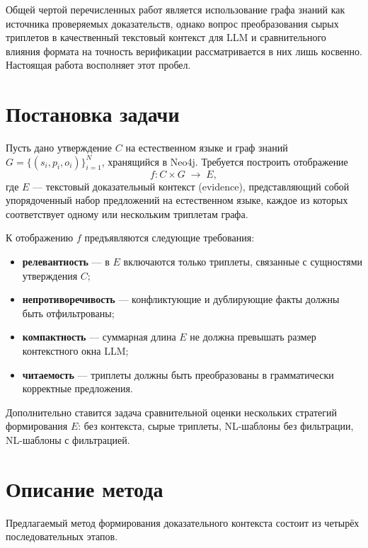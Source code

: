 \documentclass{misisarticle}
\begin{document}
Общей чертой перечисленных работ является использование
графа знаний как источника проверяемых доказательств,
однако вопрос преобразования сырых триплетов
в качественный текстовый контекст для LLM
и сравнительного влияния формата на точность верификации
рассматривается в них лишь косвенно.
Настоящая работа восполняет этот пробел.

\section{Постановка задачи}

Пусть дано утверждение $C$ на естественном языке
и граф знаний $G = \{(s_i, p_i, o_i)\}_{i=1}^{N}$,
хранящийся в Neo4j.
Требуется построить отображение
\begin{equation}
  f\colon C \times G \;\longrightarrow\; E,
  \label{eq:task}
\end{equation}
где $E$ — текстовый доказательный контекст (evidence),
представляющий собой упорядоченный набор предложений
на естественном языке, каждое из которых
соответствует одному или нескольким триплетам графа.

К отображению $f$ предъявляются следующие требования:
\begin{itemize}
  \item \textbf{релевантность} — в $E$ включаются только
    триплеты, связанные с сущностями утверждения $C$;
  \item \textbf{непротиворечивость} — конфликтующие
    и дублирующие факты должны быть отфильтрованы;
  \item \textbf{компактность} — суммарная длина $E$
    не должна превышать размер контекстного окна LLM;
  \item \textbf{читаемость} — триплеты должны быть
    преобразованы в грамматически корректные предложения.
\end{itemize}

Дополнительно ставится задача сравнительной оценки
нескольких стратегий формирования $E$:
без контекста, сырые триплеты, NL-шаблоны без фильтрации,
NL-шаблоны с фильтрацией.

\section{Описание метода}

Предлагаемый метод формирования доказательного контекста
состоит из четырёх последовательных этапов.
\end{document}
